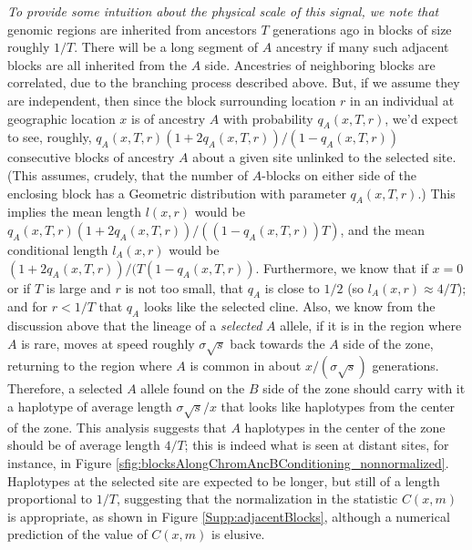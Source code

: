 \documentclass[11pt,letterpaper]{article}
\newcommand{\alisa}[1]{{\em \color{red} #1}}
\begin{document}
\alisa{To provide some intuition about the physical scale of this signal, we note that}
genomic regions are inherited from ancestors $T$ generations ago
in blocks of size roughly $1/T$.
There will be a long segment of $A$ ancestry
if many such adjacent blocks are all inherited from the $A$ side.
Ancestries of neighboring blocks are correlated,
due to the branching process described above. 
But, if we assume they are independent, 
then since the block surrounding location $r$ in an individual at geographic location $x$ is of ancestry $A$ with probability $q_A(x,T,r)$,
we'd expect to see, roughly, 
$q_A(x,T,r)(1+2q_A(x,T,r))/(1-q_A(x,T,r))$ 
consecutive blocks of ancestry $A$ about a given site unlinked to the selected site.
(This assumes, crudely, that the number of $A$-blocks on either side of the enclosing block
has a Geometric distribution with parameter $q_A(x,T,r)$.)
This implies the mean length $l(x,r)$ would be $q_A(x,T,r)(1+2q_A(x,T,r))/((1-q_A(x,T,r))T)$,
and the mean conditional length $l_A(x,r)$ would be $(1+2q_A(x,T,r))/(T(1-q_A(x,T,r))$.
Furthermore, we know that if $x=0$ or if $T$ is large and $r$ is not too small, that $q_A$ is close to $1/2$
(so $l_A(x,r) \approx 4/T$);
and for $r<1/T$ that $q_A$ looks like the selected cline.
Also, we know from the discussion above that the lineage of a \emph{selected} $A$ allele,
if it is in the region where $A$ is rare,
moves at speed roughly $\sigma \sqrt{s}$ back towards the $A$ side of the zone,
returning to the region where $A$ is common in about $x/(\sigma \sqrt{s})$ generations.
Therefore, a selected $A$ allele found on the $B$ side of the zone
should carry with it a haplotype of average length $\sigma \sqrt{s}/x$
that looks like haplotypes from the center of the zone.
This analysis suggests that $A$ haplotypes in the center of the zone should be of average length $4/T$;
this is indeed what is seen at distant sites, for instance, in Figure \ref{sfig:blocksAlongChromAncBConditioning_nonnormalized}.
Haplotypes at the selected site are expected to be longer, but still of a length proportional to $1/T$,
suggesting that the normalization in the statistic $C(x,m)$ is appropriate,
as shown in Figure \ref{Supp:adjacentBlocks},
although a numerical prediction of the value of $C(x,m)$ is elusive.
\end{document}
